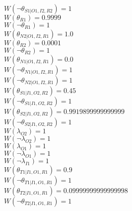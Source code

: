 $W(\neg\theta_{S1|O1,I2,R2})=1$\\
$W(\theta_{R1})=0.9999$\\
$W(\neg\theta_{R1})=1$\\
$W(\theta_{N2|O1,I2,R1})=1.0$\\
$W(\theta_{R2})=0.0001$\\
$W(\neg\theta_{R2})=1$\\
$W(\theta_{N1|O1,I2,R1})=0.0$\\
$W(\neg\theta_{N1|O1,I2,R1})=1$\\
$W(\neg\theta_{N2|O1,I2,R1})=1$\\
$W(\theta_{S1|I1,O2,R2})=0.45$\\
$W(\neg\theta_{S1|I1,O2,R2})=1$\\
$W(\theta_{S2|I1,O2,R2})=0.9919899999999999$\\
$W(\neg\theta_{S2|I1,O2,R2})=1$\\
$W(\lambda_{O2})=1$\\
$W(\neg\lambda_{O2})=1$\\
$W(\lambda_{O1})=1$\\
$W(\neg\lambda_{O1})=1$\\
$W(\neg\lambda_{I1})=1$\\
$W(\theta_{T1|I1,O1,R1})=0.9$\\
$W(\neg\theta_{T1|I1,O1,R1})=1$\\
$W(\theta_{T2|I1,O1,R1})=0.09999999999999998$\\
$W(\neg\theta_{T2|I1,O1,R1})=1$\\
